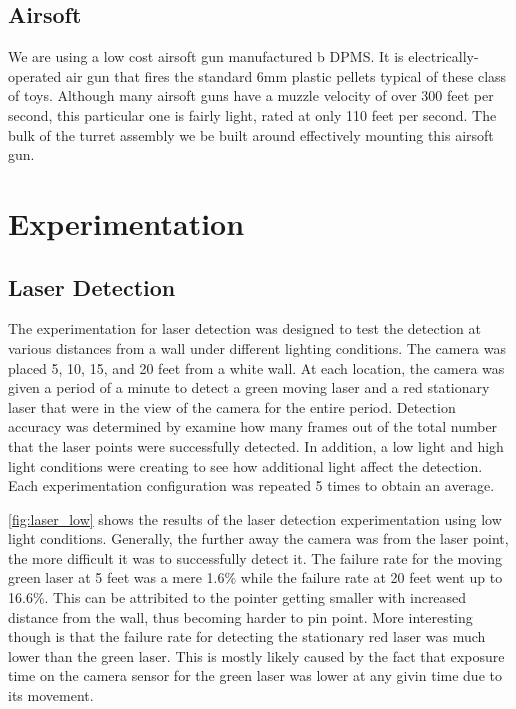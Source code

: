 \documentclass[10pt,twocolumn,letterpaper]{article}
\begin{document}
\subsection{Airsoft}

We are using a low cost airsoft gun manufactured b DPMS. It is electrically-operated air gun that fires the standard 6mm plastic pellets typical of these class of toys. Although many airsoft guns have a muzzle velocity of over 300 feet per second, this particular one is fairly light, rated at only 110 feet per second. The bulk of the turret assembly we be built around effectively mounting this airsoft gun.


\section{Experimentation}

\subsection{Laser Detection}

The experimentation for laser detection was designed to test the detection at various distances from a wall under different lighting conditions. The camera was placed 5, 10, 15, and 20 feet from a white wall. At each location, the camera was given a period of a minute to detect a green moving laser and a red stationary laser that were in the view of the camera for the entire period. Detection accuracy was determined by examine how many frames out of the total number that the laser points were successfully detected. In addition, a low light and high light conditions were creating to see how additional light affect the detection. Each experimentation configuration was repeated 5 times to obtain an average.

\ref{fig:laser_low} shows the results of the laser detection experimentation using low light conditions. Generally, the further away the camera was from the laser point, the more difficult it was to successfully detect it. The failure rate for the moving green laser at 5 feet was a mere 1.6\% while the failure rate at 20 feet went up to 16.6\%. This can be attribited to the pointer getting smaller with increased distance from the wall, thus becoming harder to pin point. More interesting though is that the failure rate for detecting the stationary red laser was much lower than the green laser. This is mostly likely caused by the fact that exposure time on the camera sensor for the green laser was lower at any givin time due to its movement.  
\end{document}
